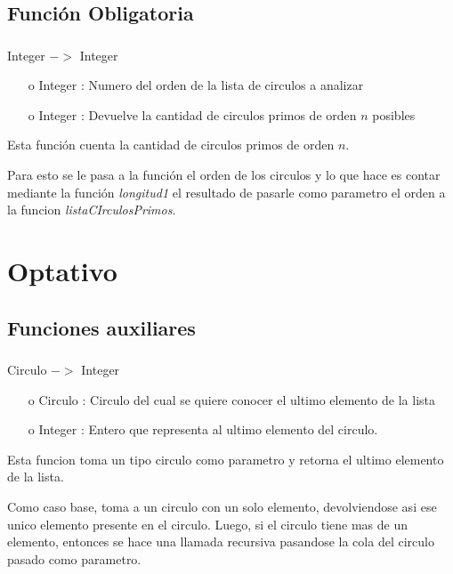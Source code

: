 \documentclass[10pt,journal]{IEEEtran}
\begin{document}
\subsection{Función Obligatoria}
\subsubsection{\color{Red}{contarCirculosPrimos}}
\begin{description}[style=nextline]
        \item[\color{Green}{Signatura}] Integer $->$ Integer   
        \begin{itemize}
        \item [o] Integer : Numero del orden de la lista de circulos a analizar  
        \item [o] Integer : Devuelve la cantidad de circulos primos de orden $n$ posibles
        \end{itemize}        
        
        \item[\color{Green}{Descripción}] Esta función cuenta la cantidad de circulos primos de orden $n$.
        
        Para esto se le pasa a la función el orden de los circulos y lo que hace es contar mediante la función \textit{longitud1} el resultado de pasarle como parametro el orden a la funcion \textit{listaCIrculosPrimos}.    
\end{description}

\section{Optativo}
\subsection{Funciones auxiliares}
\subsubsection{\color{Red}{ultimoElemento}}
\begin{description}[style=nextline]
        \item[\color{Green}{Signatura}] Circulo $->$ Integer
        \begin{itemize} 
        \item [o]  Circulo : Circulo del cual se quiere conocer el ultimo elemento de la lista
        \item [o] Integer : Entero que representa al ultimo elemento del circulo.
        \end{itemize}        
        
        \item[\color{Green}{Descripción}] Esta funcion toma un tipo circulo como parametro y retorna el ultimo elemento de la lista.
        
        Como caso base, toma a un circulo con un solo elemento, devolviendose asi ese unico elemento presente en el circulo. Luego, si el circulo tiene mas de un elemento, entonces se hace una llamada recursiva pasandose la cola del circulo pasado como parametro.     
\end{description}
\end{document}
